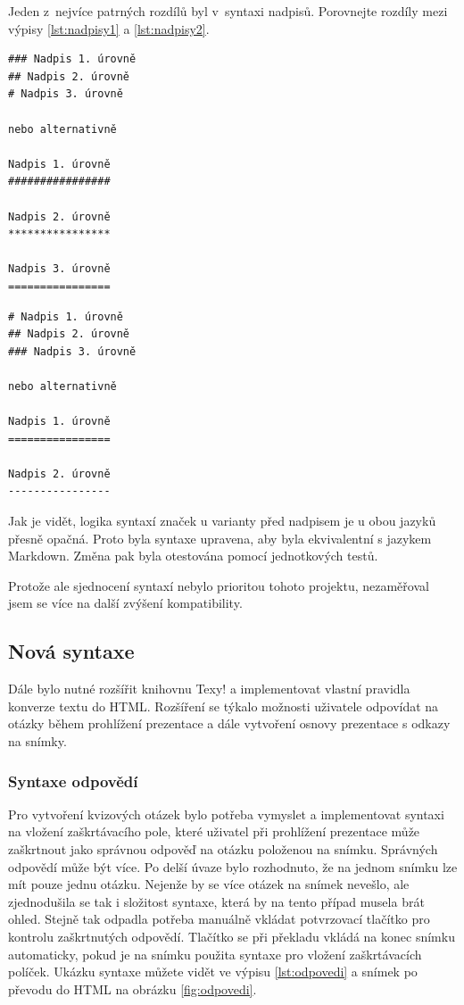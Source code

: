 \documentclass[11pt,twoside,a4paper]{book}
\begin{document}
Jeden z~nejvíce patrných rozdílů byl v~syntaxi nadpisů. Porovnejte rozdíly mezi výpisy \ref{lst:nadpisy1} a \ref{lst:nadpisy2}.

\begin{lstlisting}[caption=Ukázka nadpisů v Texy!,label={lst:nadpisy1}]
### Nadpis 1. úrovně
## Nadpis 2. úrovně
# Nadpis 3. úrovně

nebo alternativně

Nadpis 1. úrovně
################

Nadpis 2. úrovně
****************

Nadpis 3. úrovně
================
\end{lstlisting}

\begin{lstlisting}[caption=Ukázka nadpisů v Markdown,label={lst:nadpisy2}]
# Nadpis 1. úrovně
## Nadpis 2. úrovně
### Nadpis 3. úrovně

nebo alternativně

Nadpis 1. úrovně
================

Nadpis 2. úrovně
----------------
\end{lstlisting}

Jak je vidět, logika syntaxí značek u varianty před nadpisem je u obou jazyků přesně opačná. Proto byla syntaxe upravena, aby byla ekvivalentní s jazykem Markdown. Změna pak byla otestována pomocí jednotkových testů.

Protože ale sjednocení syntaxí nebylo prioritou tohoto projektu, nezaměřoval jsem se více na další zvýšení kompatibility.


\subsection{Nová syntaxe}
Dále bylo nutné rozšířit knihovnu Texy! a implementovat vlastní pravidla konverze textu do HTML. Rozšíření se týkalo možnosti uživatele odpovídat na otázky během prohlížení prezentace a dále vytvoření osnovy prezentace s odkazy na snímky.

\subsubsection{Syntaxe odpovědí}
Pro vytvoření kvizových otázek bylo potřeba vymyslet a implementovat syntaxi na vložení zaškrtávacího pole, které uživatel při prohlížení prezentace může zaškrtnout jako správnou odpověď na otázku položenou na snímku. Správných odpovědí může být více. Po delší úvaze bylo rozhodnuto, že na jednom snímku lze mít pouze jednu otázku. Nejenže by se více otázek na snímek nevešlo, ale zjednodušila se tak i složitost syntaxe, která by na tento případ musela brát ohled. Stejně tak odpadla potřeba manuálně vkládat potvrzovací tlačítko pro kontrolu zaškrtnutých odpovědí. Tlačítko se při překladu vkládá na konec snímku automaticky, pokud je na snímku použita syntaxe pro vložení zaškrtávacích políček. Ukázku syntaxe můžete vidět ve výpisu \ref{lst:odpovedi} a snímek po převodu do HTML na obrázku \ref{fig:odpovedi}.
\end{document}
